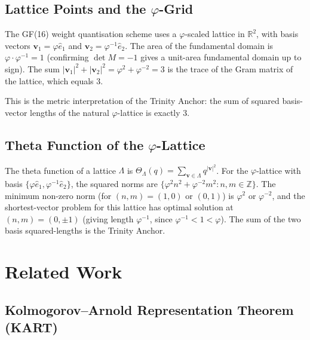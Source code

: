 \subsection{Lattice Points and the $\varphi$-Grid}

The GF(16) weight quantisation scheme uses a $\varphi$-scaled
lattice in $\mathbb{R}^{2}$, with basis vectors
$\mathbf{v}_{1} = \varphi\hat{e}_{1}$ and
$\mathbf{v}_{2} = \varphi^{-1}\hat{e}_{2}$.
The area of the fundamental domain is $\varphi \cdot \varphi^{-1} = 1$
(confirming $\det M = -1$ gives a unit-area fundamental domain
up to sign).
The sum $|\mathbf{v}_{1}|^{2}+|\mathbf{v}_{2}|^{2}
= \varphi^{2}+\varphi^{-2} = 3$ is the trace of the
Gram matrix of the lattice, which equals $3$.

This is the metric interpretation of the Trinity Anchor:
the sum of squared basis-vector lengths of the natural
$\varphi$-lattice is exactly $3$.

\subsection{Theta Function of the $\varphi$-Lattice}

The theta function of a lattice $\Lambda$ is
$\Theta_{\Lambda}(q) = \sum_{\mathbf{v}\in\Lambda} q^{|\mathbf{v}|^{2}}$.
For the $\varphi$-lattice with basis $\{\varphi\hat{e}_{1}, \varphi^{-1}\hat{e}_{2}\}$,
the squared norms are $\{\varphi^{2}n^{2}+\varphi^{-2}m^{2} : n,m\in\mathbb{Z}\}$.
The minimum non-zero norm (for $(n,m)=(1,0)$ or $(0,1)$) is
$\varphi^{2}$ or $\varphi^{-2}$, and the shortest-vector problem
for this lattice has optimal solution at $(n,m)=(0,\pm 1)$
(giving length $\varphi^{-1}$, since $\varphi^{-1} < 1 < \varphi$).
The sum of the two basis squared-lengths is the Trinity Anchor.


\section{Related Work}\label{sec:related-work}

\subsection{Kolmogorov--Arnold Representation Theorem (KART)}%
\label{subsec:kart}

